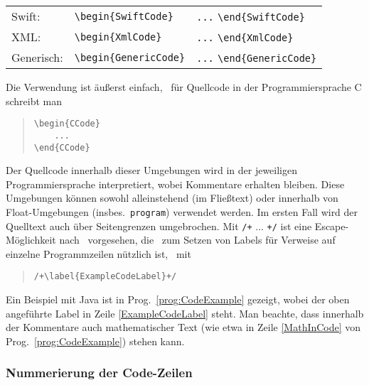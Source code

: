 \begin{table}
\begin{tabular}{@{}lll@{}}
	Swift: & \verb!\begin{SwiftCode}! & \verb!...! \verb!\end{SwiftCode}! \\
	XML: & \verb!\begin{XmlCode}! & \verb!...! \verb!\end{XmlCode}! \\
	Generisch: & \verb!\begin{GenericCode}! & \verb!...! \verb!\end{GenericCode}! \\
	\bottomrule
\end{tabular}
\end{table}
%
Die Verwendung ist äußerst einfach, \zB\ für Quellcode in der Programmiersprache C schreibt man
%
\begin{quote}
\begin{verbatim}
\begin{CCode}
    ... 
\end{CCode}
\end{verbatim}
\end{quote}
%
Der Quellcode innerhalb dieser Umgebungen wird in der jeweiligen Programmiersprache interpretiert, wobei Kommentare erhalten bleiben. Diese Umgebungen können sowohl alleinstehend (im Fließtext) oder innerhalb von Float-Umgebungen (insbes.\ \texttt{program}) verwendet werden. Im ersten Fall wird der Quelltext auch über Seitengrenzen umgebrochen. Mit \verb!/+! ... \verb!+/! ist eine Escape-Möglichkeit nach \latex\ vorgesehen, die \va\ zum Setzen von Labels für Verweise auf einzelne Programmzeilen nützlich ist, \zB\ mit
%
\begin{quote}
\verb!/+\label{ExampleCodeLabel}+/!
\end{quote}
%
Ein Beispiel mit Java ist in Prog.~\ref{prog:CodeExample} gezeigt, wobei der oben angeführte Label in Zeile \ref{ExampleCodeLabel} steht.
Man beachte, dass innerhalb der Kommentare auch mathematischer Text 
(wie etwa in Zeile \ref{MathInCode} von Prog.~\ref{prog:CodeExample}) stehen kann.


\subsubsection{Nummerierung der Code-Zeilen}

